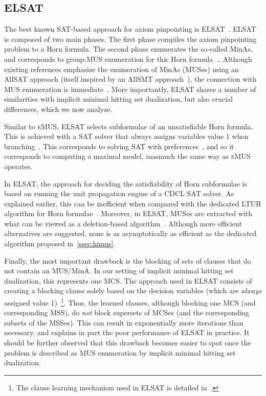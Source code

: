\documentclass{llncs}
\newcommand{\emus}{\textsc{eMUS}\xspace}
\newcommand{\elsat}{ELSAT\xspace}
\begin{document}
\subsection{\elsat}

The best known SAT-based approach for axiom pinpointing is
\elsat~\cite{sebastiani-cade09,vescovi-phd11,sebastiani-tr15}.
\elsat is composed of two main phases. The first phase compiles the
axiom pinpointing problem to a Horn formula. 
The second phase enumerates the so-called MinAs, and corresponds to
group-MUS enumeration for this Horn formula~\cite{ams-corr15}..
Although existing references emphasize the enumeration of MinAs (MUSes) using
an AllSAT approach (itself inspired by an AllSMT
approach~\cite{nieuwenhuis-cav06}), the connection with MUS
enumeration is immediate~\cite{ams-corr15}. More importantly, \elsat
shares a number of similarities with implicit minimal hitting set
dualization, but also crucial differences, which we now analyze.

Similar to \emus, \elsat selects subformulae of an unsatisfiable Horn
formula. This is achieved with a SAT solver that always assigns
variables value 1 when branching~\cite{sebastiani-tr15}. This
corresponds to solving SAT with
preferences~\cite{giunchiglia-ecai06,giunchiglia-aicomm13}, and so it
corresponds to computing a maximal model, inasmuch the same way as
\emus operates.


In \elsat, the approach for deciding the satisfiability of Horn
subformulae is based on running the unit propagation engine of a CDCL 
SAT solver. As explained earlier, this can be inefficient when
compared with the dedicated LTUR algorithm for Horn
formulae~\cite{minoux-ipl88}.
Moreover, in \elsat, MUSes are extracted with what can be viewed as a
deletion-based algorithm~\cite{bakker-ijcai93,blms-aicomm12}. Although
more efficient alternatives are suggested, none is as asymptotically
as efficient as the dedicated algorithm proposed
in~\autoref{ssec:himus}.

Finally, the most important drawback is the blocking of sets of
clauses that do not contain an MUS/MinA. In our setting of implicit
minimal hitting set dualization, this represents one MCS. The approach
used in \elsat consists of creating a blocking clause solely based on
the decision variables (which are {\em always} assigned value
1)~\cite{vescovi-phd11,sebastiani-tr15}\footnote{The clause learning
  mechanism used in \elsat is detailed in~\cite[page 17,
    first paragraph]{sebastiani-tr15}.}. Thus, the learned clauses,
although blocking one MCS (and corresponding MSS), do {\em not} block 
supersets of MCSes (and the corresponding subsets of the MSSes). This
can result in exponentially more iterations than necessary, and
explains in part the poor performance of \elsat in practice.
It should be further observed that this drawback becomes easier to
spot once the problem is described as MUS enumeration by implicit
minimal hitting set dualization.
\end{document}
